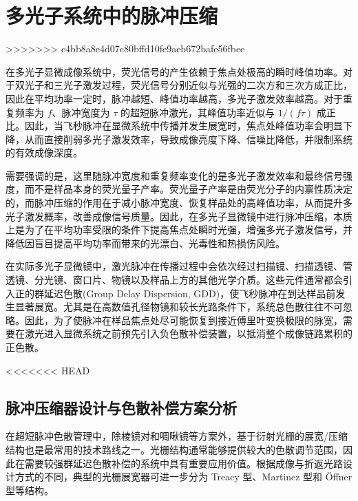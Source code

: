 \section{多光子系统中的脉冲压缩}\label{4.3}
>>>>>>> c4bb8a8e4d07c80bffd10fe9aeb672bafe56fbee

在多光子显微成像系统中，荧光信号的产生依赖于焦点处极高的瞬时峰值功率。对于双光子和三光子激发过程，荧光信号分别近似与光强的二次方和三次方成正比，因此在平均功率一定时，脉冲越短、峰值功率越高，多光子激发效率越高。对于重复频率为 $f$、脉冲宽度为 $\tau$ 的超短脉冲激光，其峰值功率近似与 $1/(f\tau)$ 成正比。因此，当飞秒脉冲在显微系统中传播并发生展宽时，焦点处峰值功率会明显下降，从而直接削弱多光子激发效率，导致成像亮度下降、信噪比降低，并限制系统的有效成像深度。

需要强调的是，这里随脉冲宽度和重复频率变化的是多光子激发效率和最终信号强度，而不是样品本身的荧光量子产率。荧光量子产率是由荧光分子的内禀性质决定的，而脉冲压缩的作用在于减小脉冲宽度、恢复样品处的高峰值功率，从而提升多光子激发概率，改善成像信号质量。因此，在多光子显微镜中进行脉冲压缩，本质上是为了在平均功率受限的条件下提高焦点处瞬时光强，增强多光子激发信号，并降低因盲目提高平均功率而带来的光漂白、光毒性和热损伤风险。

在实际多光子显微镜中，激光脉冲在传播过程中会依次经过扫描镜、扫描透镜、管透镜、分光镜、窗口片、物镜以及样品上方的其他光学介质。这些元件通常都会引入正的群延迟色散(Group Delay Dispersion, GDD)，使飞秒脉冲在到达样品前发生显著展宽。尤其是在高数值孔径物镜和较长光路条件下，系统总色散往往不可忽略。因此，为了使脉冲在样品焦点处尽可能恢复到接近傅里叶变换极限的脉宽，需要在激光进入显微系统之前预先引入负色散补偿装置，以抵消整个成像链路累积的正色散。



<<<<<<< HEAD
\subsection{脉冲压缩器设计与色散补偿方案分析}\label{4.5.1}

在超短脉冲色散管理中，除棱镜对和啁啾镜等方案外，基于衍射光栅的展宽/压缩结构也是最常用的技术路线之一。光栅结构通常能够提供较大的色散调节范围，因此在需要较强群延迟色散补偿的系统中具有重要应用价值。根据成像与折返光路设计方式的不同，典型的光栅展宽器可进一步分为 Treacy 型、Martinez 型和 Öffner 型等结构。

